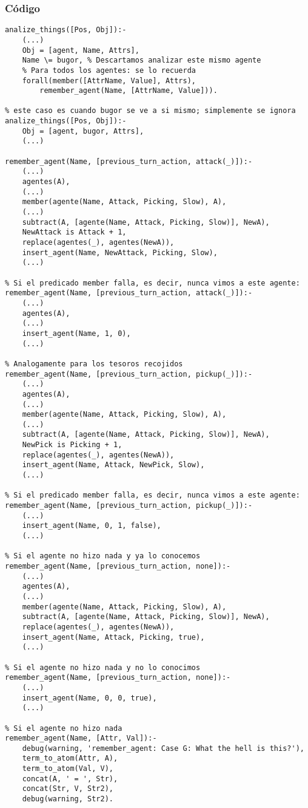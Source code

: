 \documentclass[a4paper,10pt,spanish]{article}
\begin{document}
	\subsubsection{C\'odigo}
	
	\begin{lstlisting}
analize_things([Pos, Obj]):- 
	(...)
	Obj = [agent, Name, Attrs],
	Name \= bugor, % Descartamos analizar este mismo agente
	% Para todos los agentes: se lo recuerda
	forall(member([AttrName, Value], Attrs), 
		remember_agent(Name, [AttrName, Value])).

% este caso es cuando bugor se ve a si mismo; simplemente se ignora
analize_things([Pos, Obj]):- 
	Obj = [agent, bugor, Attrs],
	(...)

remember_agent(Name, [previous_turn_action, attack(_)]):- 
	(...)
	agentes(A),
	(...)
	member(agente(Name, Attack, Picking, Slow), A),
	(...)
	subtract(A, [agente(Name, Attack, Picking, Slow)], NewA),
	NewAttack is Attack + 1,
	replace(agentes(_), agentes(NewA)),
	insert_agent(Name, NewAttack, Picking, Slow),
	(...)

% Si el predicado member falla, es decir, nunca vimos a este agente:
remember_agent(Name, [previous_turn_action, attack(_)]):- 
	(...)
	agentes(A),
	(...)
	insert_agent(Name, 1, 0),
	(...)

% Analogamente para los tesoros recojidos
remember_agent(Name, [previous_turn_action, pickup(_)]):- 
	(...)
	agentes(A),
	(...)
	member(agente(Name, Attack, Picking, Slow), A),
	(...)
	subtract(A, [agente(Name, Attack, Picking, Slow)], NewA),
	NewPick is Picking + 1,
	replace(agentes(_), agentes(NewA)),
	insert_agent(Name, Attack, NewPick, Slow),
	(...)

% Si el predicado member falla, es decir, nunca vimos a este agente:
remember_agent(Name, [previous_turn_action, pickup(_)]):- 
	(...)
	insert_agent(Name, 0, 1, false),
	(...)

% Si el agente no hizo nada y ya lo conocemos
remember_agent(Name, [previous_turn_action, none]):- 
	(...)
	agentes(A),
	(...)
	member(agente(Name, Attack, Picking, Slow), A),
	subtract(A, [agente(Name, Attack, Picking, Slow)], NewA),
	replace(agentes(_), agentes(NewA)),
	insert_agent(Name, Attack, Picking, true),
	(...)

% Si el agente no hizo nada y no lo conocimos
remember_agent(Name, [previous_turn_action, none]):- 
	(...)
	insert_agent(Name, 0, 0, true),
	(...)

% Si el agente no hizo nada
remember_agent(Name, [Attr, Val]):- 
	debug(warning, 'remember_agent: Case G: What the hell is this?'),
	term_to_atom(Attr, A),
	term_to_atom(Val, V),
	concat(A, ' = ', Str),
	concat(Str, V, Str2),
	debug(warning, Str2).


\end{lstlisting}
\end{document}
